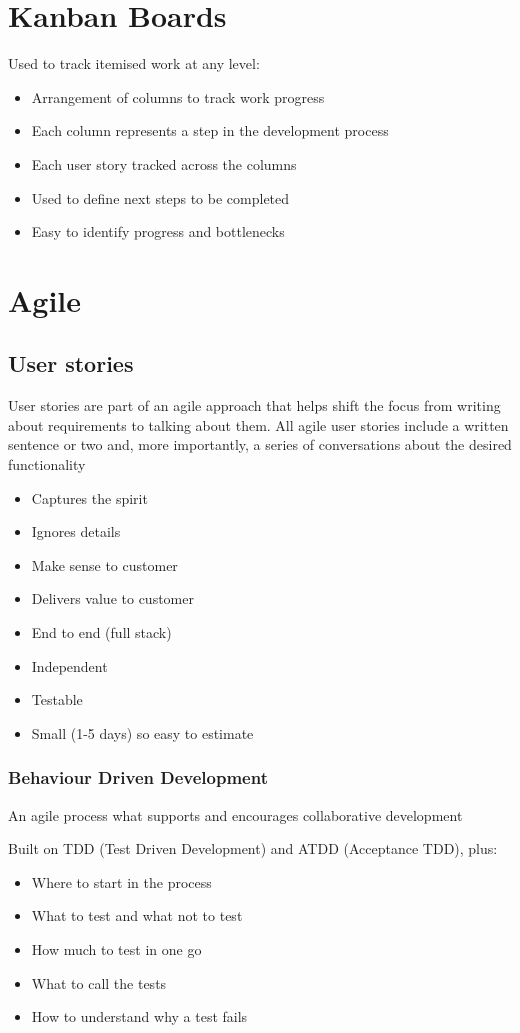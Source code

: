 \documentclass{article}[18pt]
\begin{document}
\section{Kanban Boards}
Used to track itemised work at any level:
\begin{itemize}
	\item Arrangement of columns to track work progress
	\item Each column represents a step in the development process
	\item Each user story tracked across the columns
	\item Used to define next steps to be completed
	\item Easy to identify progress and bottlenecks
\end{itemize}

\section{Agile}
\subsection{User stories}
\begin{defin}
User stories are part of an agile approach that helps shift the focus from writing about requirements to talking about them. All agile user stories include a written sentence or two and, more importantly, a series of conversations about the desired functionality
\end{defin}
\begin{itemize}
	\item Captures the spirit
	\item Ignores details
	\item Make sense to customer
	\item Delivers value to customer
	\item End to end (full stack)
	\item Independent
	\item Testable
	\item Small (1-5 days) so easy to estimate
\end{itemize}
\subsubsection{Behaviour Driven Development}
\begin{defin}
An agile process what supports and encourages collaborative development
\end{defin}
Built on TDD (Test Driven Development) and ATDD (Acceptance TDD), plus:
\begin{itemize}
	\item Where to start in the process
	\item What to test and what not to test
	\item How much to test in one go
	\item What to call the tests
	\item How to understand why a test fails
\end{itemize}
\end{document}
